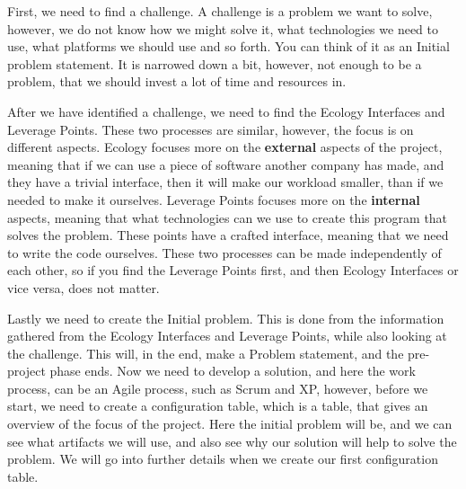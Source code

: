 First, we need to find a challenge.
A challenge is a problem we want to solve, however, we do not know how we might solve it, what technologies we need to use, what platforms we should use and so forth.
You can think of it as an Initial problem statement.
It is narrowed down a bit, however, not enough to be a problem, that we should invest a lot of time and resources in.

After we have identified a challenge, we need to find the Ecology Interfaces and Leverage Points.
These two processes are similar, however, the focus is on different aspects.
Ecology focuses more on the \textbf{external} aspects of the project, meaning that if we can use a piece of software another company has made, and they have a trivial interface, then it will make our workload smaller, than if we needed to make it ourselves.
Leverage Points focuses more on the \textbf{internal} aspects, meaning that what technologies can we use to create this program that solves the problem.
These points have a crafted interface, meaning that we need to write the code ourselves.
These two processes can be made independently of each other, so if you find the Leverage Points first, and then Ecology Interfaces or vice versa, does not matter.

Lastly we need to create the Initial problem. 
This is done from the information gathered from the Ecology Interfaces and Leverage Points, while also looking at the challenge.
This will, in the end, make a Problem statement, and the pre-project phase ends.
Now we need to develop a solution, and here the work process, can be an Agile process, such as Scrum and XP, however, before we start, we need to create a configuration table, which is a table, that gives an overview of the focus of the project. Here the initial problem will be, and we can see what artifacts we will use, and also see why our solution will help to solve the problem.
We will go into further details when we create our first configuration table.
